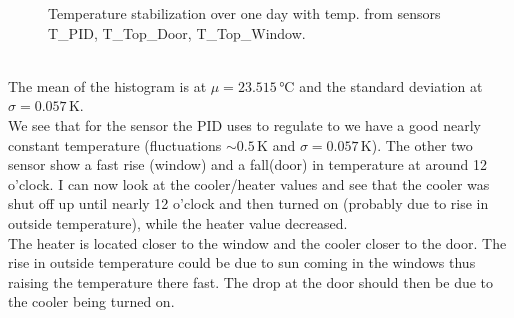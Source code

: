 \documentclass[12pt]{scrartcl}
\begin{document}
\begin{figure}[h!]
          \caption{Temperature stabilization over one day with temp. from
          sensors T\_PID, T\_Top\_Door, T\_Top\_Window.}
          \label{fig11}
        \end{figure} \\
        The mean of the histogram is at $\mu = 23.515\,\text{°C}$ and the standard
        deviation at $\sigma = 0.057\,\text{K}$. \\
        We see that for the sensor the PID uses to regulate to we have a good
        nearly constant temperature (fluctuations $\sim 0.5\,\text{K}$ and
        $\sigma = 0.057\,\text{K}$). The other two sensor show a fast rise
        (window) and a fall(door) in temperature at around 12 o'clock. I can now
        look at the cooler/heater values and see that the cooler was shut off up
        until nearly 12 o'clock and then turned on (probably due to rise in
        outside temperature), while the heater value decreased. \\
        The heater is located closer to the window and the cooler closer to the
        door.
        The rise in outside temperature could be due to sun coming in the
        windows thus raising the temperature there fast. The drop at the door
        should then be due to the cooler being turned on.
      \newpage
\end{document}
